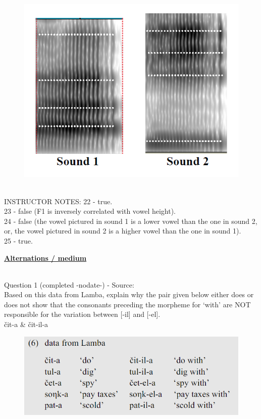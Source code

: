 \documentclass[12pt]{article}
\begin{document}
\begin{figure}[H]
\includegraphics{../images/sound1a_sound2i.png}
\end{figure}

~\\
INSTRUCTOR NOTES: 22 - true. \\23 - false (F1 is inversely correlated with vowel height). \\24 - false (the vowel pictured in sound 1 is a lower vowel than the one in sound 2, or, the vowel pictured in sound 2 is a higher vowel than the one in sound 1).\\25 - true.


\newpage\textbf{\underline{\huge Alternations / medium\\}}

~\\

{\large Question 1} (completed -nodate-) - Source: \\

Based on this data from Lamba, explain why the pair given below either does or does not show that the consonants preceding the morpheme for `with' are NOT responsible for the variation between [-il] and [-el].\\

čit-a \& čit-il-a

\begin{figure}[H]
\includegraphics{../images/peng119_lamba.png}
\end{figure}
\end{document}
